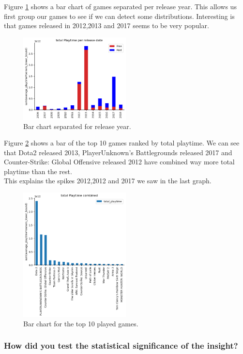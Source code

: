 \documentclass[11pt]{article}
\begin{document}
Figure \ref{fig:insight1_2} shows a bar chart of games separated per release year. This allows us first group our games to see if we can detect some distributions. Interesting is that games released in 2012,2013 and 2017 seems to be very popular. 
\begin{figure}
    \centering
    \includegraphics[width=0.5\textwidth]{graphics/insight1_graph2.png}
    \caption{Bar chart separated for release year.}
    \label{fig:insight1_2}
\end{figure}

Figure \ref{fig:insight1_3} shows a bar of the top 10 games ranked by total playtime. We can see that Dota2 released  2013, PlayerUnknown's Battlegrounds released 2017 and Counter-Strike: Global Offensive released 2012 have combined way more total playtime than the rest.\\
This explains the spikes 2012,2012 and 2017 we saw in the last graph.
\begin{figure}
    \centering
    \includegraphics[width=0.5\textwidth]{graphics/insight1_graph3.png}
    \caption{Bar chart for the top 10 played games.}
    \label{fig:insight1_3}
\end{figure}

\subsubsection{How did you test the statistical significance of the insight?}
\end{document}
